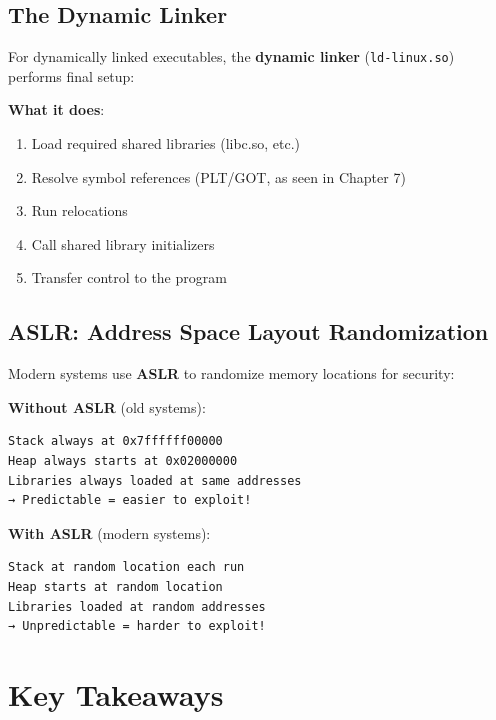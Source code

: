\subsection{The Dynamic Linker}

For dynamically linked executables, the \textbf{dynamic linker} (\texttt{ld-linux.so}) performs final setup:

\textbf{What it does}:
\begin{enumerate}
    \item Load required shared libraries (libc.so, etc.)
    \item Resolve symbol references (PLT/GOT, as seen in Chapter 7)
    \item Run relocations
    \item Call shared library initializers
    \item Transfer control to the program
\end{enumerate}

\subsection{ASLR: Address Space Layout Randomization}

Modern systems use \textbf{ASLR} to randomize memory locations for security:

\textbf{Without ASLR} (old systems):
\begin{verbatim}
Stack always at 0x7ffffff00000
Heap always starts at 0x02000000
Libraries always loaded at same addresses
→ Predictable = easier to exploit!
\end{verbatim}

\textbf{With ASLR} (modern systems):
\begin{verbatim}
Stack at random location each run
Heap starts at random location
Libraries loaded at random addresses
→ Unpredictable = harder to exploit!
\end{verbatim}

\section{Key Takeaways}

